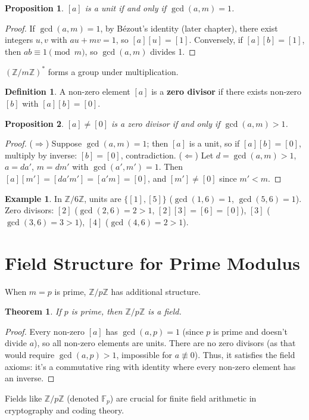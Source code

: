 \documentclass[12pt,openany]{book}
\theoremstyle{definition}
\newtheorem{definition}{Definition}[chapter]
\newtheorem{example}{Example}[chapter]
\theoremstyle{plain}
\newtheorem{theorem}{Theorem}[chapter]
\newtheorem{proposition}{Proposition}[chapter]
\theoremstyle{remark}
\begin{document}
\begin{proposition}
  $[a]$ is a unit if and only if $\gcd(a, m) = 1$.
\end{proposition}

\begin{proof}
  If $\gcd(a, m) = 1$, by Bézout's identity (later chapter), there exist integers $u, v$ with $a u + m v = 1$, so $[a] [u] = [1]$. Conversely, if $[a] [b] = [1]$, then $a b \equiv 1 \pmod{m}$, so $\gcd(a, m)$ divides 1.
\end{proof}
\noindent
$(\mathbb{Z}/m\mathbb{Z})^*$ forms a group under multiplication.

\begin{definition}
  A non-zero element $[a]$ is a \textbf{zero divisor} if there exists non-zero $[b]$ with $[a] [b] = [0]$.
\end{definition}

\begin{proposition}
  $[a] \neq [0]$ is a zero divisor if and only if $\gcd(a, m) > 1$.
\end{proposition}

\begin{proof}
  ($\Rightarrow$) Suppose $\gcd(a, m) = 1$; then $[a]$ is a unit, so if $[a] [b] = [0]$, multiply by inverse: $[b] = [0]$, contradiction.  
  ($\Leftarrow$) Let $d = \gcd(a, m) > 1$, $a = d a'$, $m = d m'$ with $\gcd(a', m') = 1$. Then $[a] [m'] = [d a' m'] = [a' m] = [0]$, and $[m'] \neq [0]$ since $m' < m$.
\end{proof}

\begin{example}
  In $\mathbb{Z}/6\mathbb{Z}$, units are $\{[1], [5]\}$ ($\gcd(1,6)=1$, $\gcd(5,6)=1$). Zero divisors: $[2]$ ($\gcd(2,6)=2>1$, $[2][3]=[6]=[0]$), $[3]$ ($\gcd(3,6)=3>1$), $[4]$ ($\gcd(4,6)=2>1$).
\end{example}

\section{Field Structure for Prime Modulus}

When $m = p$ is prime, $\mathbb{Z}/p\mathbb{Z}$ has additional structure.

\begin{theorem}
  If $p$ is prime, then $\mathbb{Z}/p\mathbb{Z}$ is a field.
\end{theorem}

\begin{proof}
  Every non-zero $[a]$ has $\gcd(a, p) = 1$ (since $p$ is prime and doesn't divide $a$), so all non-zero elements are units. There are no zero divisors (as that would require $\gcd(a, p) > 1$, impossible for $a \not\equiv 0$). Thus, it satisfies the field axioms: it's a commutative ring with identity where every non-zero element has an inverse.
\end{proof}
\noindent
Fields like $\mathbb{Z}/p\mathbb{Z}$ (denoted $\mathbb{F}_p$) are crucial for finite field arithmetic in cryptography and coding theory.
\end{document}

